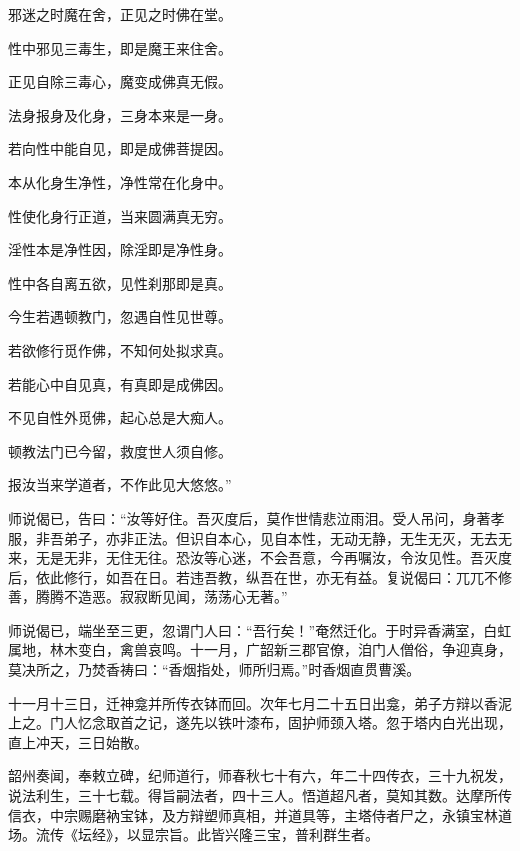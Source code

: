 \documentclass[12pt,twoside,openany]{book}
\begin{document}
邪迷之时魔在舍，正见之时佛在堂。

性中邪见三毒生，即是魔王来住舍。

正见自除三毒心，魔变成佛真无假。

法身报身及化身，三身本来是一身。

若向性中能自见，即是成佛菩提因。

本从化身生净性，净性常在化身中。

性使化身行正道，当来圆满真无穷。

淫性本是净性因，除淫即是净性身。

性中各自离五欲，见性刹那即是真。

今生若遇顿教门，忽遇自性见世尊。

若欲修行觅作佛，不知何处拟求真。

若能心中自见真，有真即是成佛因。

不见自性外觅佛，起心总是大痴人。

顿教法门已今留，救度世人须自修。

报汝当来学道者，不作此见大悠悠。”

师说偈已，告曰：“汝等好住。吾灭度后，莫作世情悲泣雨泪。受人吊问，身著孝服，非吾弟子，亦非正法。但识自本心，见自本性，无动无静，无生无灭，无去无来，无是无非，无住无往。恐汝等心迷，不会吾意，今再嘱汝，令汝见性。吾灭度后，依此修行，如吾在日。若违吾教，纵吾在世，亦无有益。复说偈曰：兀兀不修善，腾腾不造恶。寂寂断见闻，荡荡心无著。”

师说偈已，端坐至三更，忽谓门人曰：“吾行矣！”奄然迁化。于时异香满室，白虹属地，林木变白，禽兽哀鸣。十一月，广韶新三郡官僚，洎门人僧俗，争迎真身，莫决所之，乃焚香祷曰：“香烟指处，师所归焉。”时香烟直贯曹溪。

十一月十三日，迁神龛并所传衣钵而回。次年七月二十五日出龛，弟子方辩以香泥上之。门人忆念取首之记，遂先以铁叶漆布，固护师颈入塔。忽于塔内白光出现，直上冲天，三日始散。

韶州奏闻，奉敕立碑，纪师道行，师春秋七十有六，年二十四传衣，三十九祝发，说法利生，三十七载。得旨嗣法者，四十三人。悟道超凡者，莫知其数。达摩所传信衣，中宗赐磨衲宝钵，及方辩塑师真相，并道具等，主塔侍者尸之，永镇宝林道场。流传《坛经》，以显宗旨。此皆兴隆三宝，普利群生者。
\end{document}
